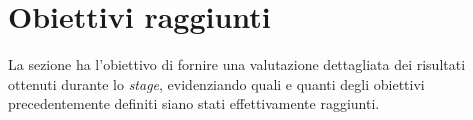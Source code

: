 \section{Obiettivi raggiunti}
La sezione ha l’obiettivo di fornire una valutazione dettagliata dei risultati ottenuti durante lo \textit{stage}, evidenziando quali e quanti degli obiettivi precedentemente definiti siano stati effettivamente raggiunti.